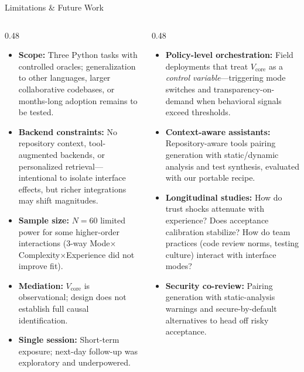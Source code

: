 \documentclass[10pt,aspectratio=169]{beamer}
\begin{document}

\begin{frame}{Limitations \& Future Work}
\begin{columns}[T]
\begin{column}{0.48\textwidth}
\begin{alertbox}[Limitations]
\scriptsize
\begin{itemize}\setlength\itemsep{3pt}
  \item \textbf{Scope:} Three Python tasks with controlled oracles; generalization to other languages, larger collaborative codebases, or months-long adoption remains to be tested.
  \item \textbf{Backend constraints:} No repository context, tool-augmented backends, or personalized retrieval---intentional to isolate interface effects, but richer integrations may shift magnitudes.
  \item \textbf{Sample size:} $N{=}60$ limited power for some higher-order interactions (3-way Mode$\times$Complexity$\times$Experience did not improve fit).
  \item \textbf{Mediation:} $V_{\text{core}}$ is observational; design does not establish full causal identification.
  \item \textbf{Single session:} Short-term exposure; next-day follow-up was exploratory and underpowered.
\end{itemize}
\end{alertbox}
\end{column}
\begin{column}{0.48\textwidth}
\begin{keybox}
\scriptsize
\begin{itemize}\setlength\itemsep{3pt}
  \item \textbf{Policy-level orchestration:} Field deployments that treat $V_{\text{core}}$ as a \emph{control variable}---triggering mode switches and transparency-on-demand when behavioral signals exceed thresholds.
  \item \textbf{Context-aware assistants:} Repository-aware tools pairing generation with static/dynamic analysis and test synthesis, evaluated with our portable recipe.
  \item \textbf{Longitudinal studies:} How do trust shocks attenuate with experience? Does acceptance calibration stabilize? How do team practices (code review norms, testing culture) interact with interface modes?
  \item \textbf{Security co-review:} Pairing generation with static-analysis warnings and secure-by-default alternatives to head off risky acceptance.
\end{itemize}
\end{keybox}
\end{column}
\end{columns}
\end{frame}
\end{document}
